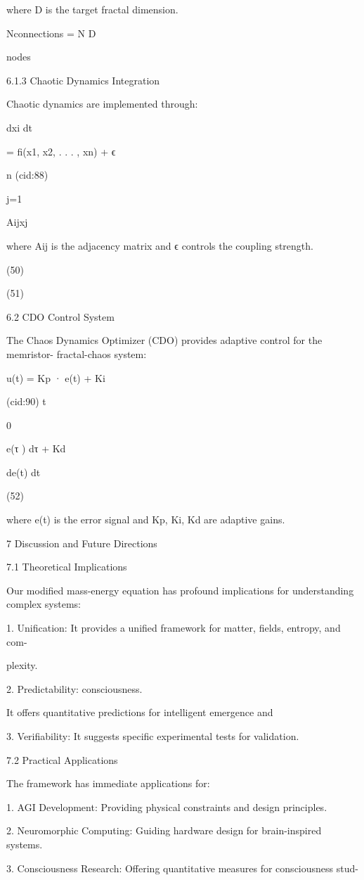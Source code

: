 where D is the target fractal dimension.

Nconnections = N D

nodes

6.1.3 Chaotic Dynamics Integration

Chaotic dynamics are implemented through:

dxi
dt

= fi(x1, x2, . . . , xn) + ϵ

n
(cid:88)

j=1

Aijxj

where Aij is the adjacency matrix and ϵ controls the coupling strength.

(50)

(51)

6.2 CDO Control System

The Chaos Dynamics Optimizer (CDO) provides adaptive control for the memristor-
fractal-chaos system:

u(t) = Kp · e(t) + Ki

(cid:90) t

0

e(τ ) dτ + Kd

de(t)
dt

(52)

where e(t) is the error signal and Kp, Ki, Kd are adaptive gains.

7 Discussion and Future Directions

7.1 Theoretical Implications

Our modified mass-energy equation has profound implications for understanding complex
systems:

1. Unification: It provides a unified framework for matter, fields, entropy, and com-

plexity.

2. Predictability:
consciousness.

It offers quantitative predictions for intelligent emergence and

3. Verifiability: It suggests specific experimental tests for validation.

7.2 Practical Applications

The framework has immediate applications for:

1. AGI Development: Providing physical constraints and design principles.

2. Neuromorphic Computing: Guiding hardware design for brain-inspired systems.

3. Consciousness Research: Offering quantitative measures for consciousness stud-

